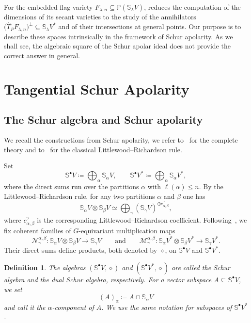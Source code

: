 \documentclass[a4paper,reqno]{amsart}
\theoremstyle{plainnopunct}
\theoremstyle{definitionnopunct}
\newtheorem{definition}[definition]{Definition}
\renewcommand{\P}{\mathbb{P}}
\renewcommand{\S}{\mathbb{S}}
\begin{document}
For the embedded flag variety $F_{\lambda,n}\subseteq\P(\S_\lambda V)$,  reduces the computation of the dimensions of its secant varieties to the study of the annihilators $\bigl(\widehat T_PF_{\lambda,n}\bigr)^\perp \subseteq \S_\lambda V^*$ and of their intersections at general points. Our purpose is to describe these spaces intrinsically in the framework of Schur apolarity. As we shall see, the algebraic square of the Schur apolar ideal does not provide the correct answer in general.

\section{Tangential Schur Apolarity}
\label{sect: tangential Schur apolarity}

\subsection{The Schur algebra and Schur apolarity}
\label{subsect: Schur algebra and apolarity}

We recall the constructions from Schur apolarity, we refer to~\cite{StaffolaniThesis, Staffolani2023} for the complete theory and to~\cite{Fulton1997} for the classical Littlewood--Richardson rule. 

Set
\[
\S^\bullet V
\coloneq
\bigoplus_{\alpha}\S_\alpha V,
\qquad
\S^\bullet V^*
\coloneq
\bigoplus_{\alpha}\S_\alpha V^*,
\]
where the direct sums run over the partitions $\alpha$ with $\ell(\alpha)\leq n$. By the Littlewood--Richardson rule, for any two partitions $\alpha$ and $\beta$ one has
\[
\S_\alpha V\otimes\S_\beta V
\simeq
\bigoplus_{\gamma}
\left(\S_\gamma V\right)^{\oplus c_{\alpha,\beta}^{\gamma}},
\]
where $c_{\alpha,\beta}^{\gamma}$ is the corresponding Littlewood--Richardson coefficient. Following~\cite{Staffolani2023}, we fix coherent families of $G$-equivariant multiplication maps
\[
\mathcal N_{\gamma}^{\alpha,\beta}:
\S_\alpha V\otimes\S_\beta V
\longrightarrow
\S_\gamma V \qquad \text{and} \qquad \mathcal M_{\gamma}^{\alpha,\beta}:
\S_\alpha V^*\otimes\S_\beta V^*
\longrightarrow
\S_\gamma V^*.
\]
Their direct sums define products, both denoted by $\diamond$, on $\S^\bullet V$ and $\S^\bullet V^*$.

\begin{definition}
\label{def: Schur algebras}
The algebras $(\S^\bullet V,\diamond)$ and $(\S^\bullet V^*,\diamond)$ are called the \emph{Schur algebra} and the \emph{dual Schur algebra}, respectively. For a vector subspace $A\subseteq\S^\bullet V$, we set
\[
(A)_\alpha
\coloneq
A\cap\S_\alpha V
\]
and call it the \emph{$\alpha$-component} of $A$. We use the same notation for subspaces of $\S^\bullet V^*$.
\end{definition}
\end{document}
